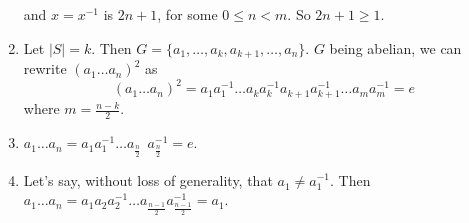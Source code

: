\begin{enumerate}
        and $x = x^{-1}$ is $2n + 1$, for some $0 \leqslant n < m$. So $2n + 1 \geqslant 1$.
    \item Let $|S| = k$. Then $G = \{a_1, \ldots, a_k, a_{k+1}, \ldots, a_n\}$. $G$ being abelian, we can rewrite $(a_1\ldots a_n)^2$ as 
        $$(a_1\ldots a_n)^2 = a_1a_1^{-1}\ldots a_ka_k^{-1}a_{k+1}a_{k+1}^{-1}\ldots a_{m}a_{m}^{-1} = e$$ where $m = \frac{n - k}{2}$.
    \item $a_1\ldots a_n = a_1a_1^{-1}\ldots a_{\frac{n}{2}}^{\phantom{-1}}a_{\frac{n}{2}}^{-1} = e$.
    \item Let's say, without loss of generality, that $a_1^{\phantom{1}} \ne a_1^{-1}$. Then $a_1\ldots a_n = a_1a_2a_2^{-1}\ldots a_{\frac{n-1}{2}}^{\phantom{-1}}a_{\frac{n-1}{2}}^{-1} = a_1$.
\end{enumerate}

